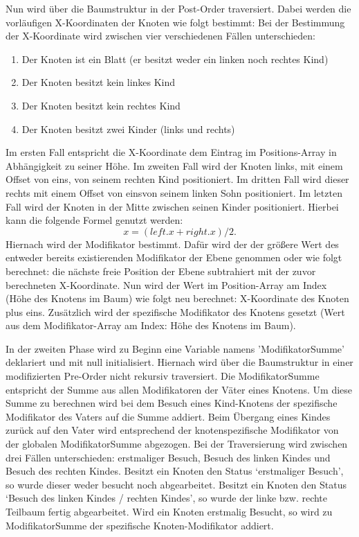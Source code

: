 Nun wird über die Baumstruktur in der Post-Order traversiert. Dabei werden die vorläufigen X-Koordinaten der Knoten wie folgt bestimmt:
Bei der Bestimmung der X-Koordinate wird zwischen vier verschiedenen Fällen unterschieden:
\begin{enumerate}
	\item Der Knoten ist ein Blatt (er besitzt weder ein linken noch rechtes Kind)
	\item Der Knoten besitzt kein linkes Kind
	\item Der Knoten besitzt kein rechtes Kind
	\item Der Knoten besitzt zwei Kinder (links und rechts)
\end{enumerate}

Im ersten Fall entspricht die X-Koordinate dem Eintrag im Positions-Array in Abhängigkeit zu seiner Höhe.
Im zweiten Fall wird der Knoten links, mit einem Offset von eins, von seinem rechten Kind positioniert.
Im dritten Fall wird dieser rechts mit einem Offset von einsvon seinem linken Sohn positioniert. Im letzten Fall wird der Knoten
in der Mitte zwischen seinen Kinder positioniert. Hierbei kann die folgende Formel genutzt werden: $$x = (left.x + right.x) / 2.$$
Hiernach wird der Modifikator bestimmt. Dafür wird der der größere Wert des entweder bereits existierenden Modifikator der Ebene genommen
oder wie folgt berechnet: die nächste freie Position der Ebene subtrahiert mit der zuvor berechneten X-Koordinate.
Nun wird der Wert im Position-Array am Index (Höhe des Knotens im Baum) wie folgt neu berechnet:
X-Koordinate des Knoten plus eins. Zusätzlich wird der spezifische Modifikator des Knotens gesetzt
(Wert aus dem Modifikator-Array am Index: Höhe des Knotens im Baum).

In der zweiten Phase wird zu Beginn eine Variable namens 'ModifikatorSumme' deklariert und mit null initialisiert.
Hiernach wird über die Baumstruktur in einer modifizierten Pre-Order nicht rekursiv traversiert. Die ModifikatorSumme entspricht
der Summe aus allen Modifikatoren der Väter eines Knotens. Um diese Summe zu berechnen wird bei dem Besuch eines Kind-Knotens
der spezifische Modifikator des Vaters auf die Summe addiert. Beim Übergang eines Kindes zurück auf den Vater wird entsprechend
der knotenspezifische Modifikator von der globalen ModifikatorSumme abgezogen. Bei der Traversierung wird zwischen
drei Fällen unterschieden: erstmaliger Besuch, Besuch des linken Kindes und Besuch des rechten Kindes. Besitzt ein Knoten den Status
‘erstmaliger Besuch’, so wurde dieser weder besucht noch abgearbeitet. Besitzt ein Knoten den Status ‘Besuch des linken Kindes / rechten Kindes’,
so wurde der linke bzw. rechte Teilbaum fertig abgearbeitet.
Wird ein Knoten erstmalig Besucht, so wird zu ModifikatorSumme der spezifische Knoten-Modifikator addiert. 

